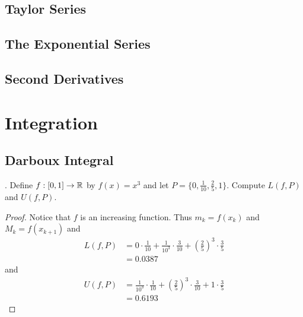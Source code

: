 \documentclass[a4paper]{article}
\begin{document}
\subsection{Taylor Series}
\subsection{The Exponential Series}
\subsection{Second Derivatives}
\pagebreak
\section{Integration}
\subsection{Darboux Integral}
\begin{qtn}{}{}
\thetcbcounter.\;\; Define $f:[0,1]\to\mathbb{R}$ by $f(x)=x^3$ and let $P=\{0,\frac{1}{10}, \frac{2}{5},1\}$. Compute $L(f,P)$ and $U(f,P)$. \\\hspace*{\fill}\cite{R0003}\tcbline
\begin{proof}
Notice that $f$ is an increasing function. Thus $m_k=f(x_k)$ and $M_k=f(x_{k+1})$ and 
\begin{align*}
L(f,P)&=0\cdot\frac{1}{10}+\frac{1}{10^3}\cdot\frac{3}{10}+\left(\frac{2}{5}\right)^3\cdot\frac{3}{5}\\
&=0.0387
\end{align*}
and 
\begin{align*}
U(f,P)&=\frac{1}{10^3}\cdot\frac{1}{10}+\left(\frac{2}{5}\right)^3\cdot\frac{3}{10}+1\cdot\frac{3}{5}\\
&=0.6193
\end{align*}
\end{proof}
\end{qtn}
\end{document}
